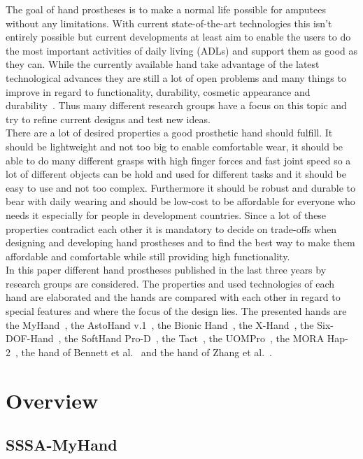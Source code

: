 \documentclass[a4paper, 10pt, conference]{ieeeconf}      %
\begin{document}
The goal of hand prostheses is to make a normal life possible for amputees without any limitations. With current state-of-the-art technologies this isn't entirely possible but current developments at least aim to enable the users to do the most important activities of daily living (ADLs) and support them as good as they can. While the currently available hand take advantage of the latest technological advances they are still a lot of open problems and many things to improve in regard to functionality, durability, cosmetic appearance and durability~\cite{review}. Thus many different research groups have a focus on this topic and try to refine current designs and test new ideas.\\
There are a lot of desired properties a good prosthetic hand should fulfill. It should be lightweight and not too big to enable comfortable wear, it should be able to do many different grasps with high finger forces and fast joint speed so a lot of different objects can be hold and used for different tasks and it should be easy to use and not too complex. Furthermore it should be robust and durable to bear with daily wearing and should be low-cost to be affordable for everyone who needs it especially for people in development countries. Since a lot of these properties contradict each other it is mandatory to decide on trade-offs when designing and developing hand prostheses and to find the best way to make them affordable and comfortable while still providing high functionality.\\
In this paper different hand prostheses published in the last three years by research groups are considered. The properties and used technologies of each hand are elaborated and the hands are compared with each other in regard to special features and where the focus of the design lies. The presented hands are the MyHand~\cite{myhand}, the AstoHand v.1~\cite{astohand}, the Bionic Hand~\cite{bionichand}, the X-Hand~\cite{xhand}, the Six-DOF-Hand~\cite{6dofhand}, the SoftHand Pro-D~\cite{softhand}, the Tact~\cite{tact}, the UOMPro~\cite{uompro}, the MORA Hap-2~\cite{morahap2}, the hand of Bennett et al.~\cite{bennett} and the hand of Zhang et al.~\cite{zhang}.
 

\section{Overview}

\subsection{SSSA-MyHand}
\end{document}
